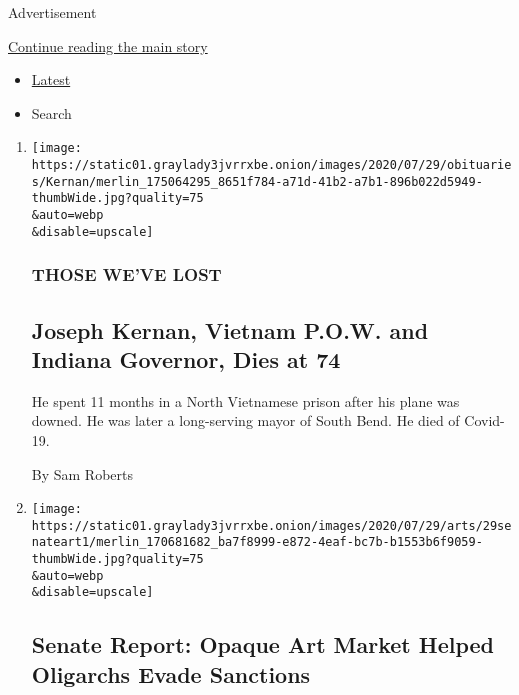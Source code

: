 Advertisement

\protect\hyperlink{after-mid1}{Continue reading the main story}

\begin{itemize}
\tightlist
\item
  \protect\hyperlink{stream-panel}{Latest}
\item
  Search
\end{itemize}

\begin{enumerate}
\def\labelenumi{\arabic{enumi}.}
\item
  \href{/2020/07/29/us/politics/joseph-kernan-dead-coronavirus.html}{}

  \texttt{[image: https://static01.graylady3jvrrxbe.onion/images/2020/07/29/obituaries/Kernan/merlin\_175064295\_8651f784-a71d-41b2-a7b1-896b022d5949-thumbWide.jpg?quality=75\\\&auto=webp\\\&disable=upscale]}

  \hypertarget{those-weve-lost}{%
  \subsubsection{THOSE WE'VE LOST}\label{those-weve-lost}}

  \hypertarget{joseph-kernan-vietnam-pow-and-indiana-governor-dies-at-74}{%
  \subsection{Joseph Kernan, Vietnam P.O.W. and Indiana Governor, Dies
  at
  74}\label{joseph-kernan-vietnam-pow-and-indiana-governor-dies-at-74}}

  He spent 11 months in a North Vietnamese prison after his plane was
  downed. He was later a long-serving mayor of South Bend. He died of
  Covid-19.

  By Sam Roberts
\item
  \href{/2020/07/29/arts/design/senate-report-art-market-russia-oligarchs-sanctions.html}{}

  \texttt{[image: https://static01.graylady3jvrrxbe.onion/images/2020/07/29/arts/29senateart1/merlin\_170681682\_ba7f8999-e872-4eaf-bc7b-b1553b6f9059-thumbWide.jpg?quality=75\\\&auto=webp\\\&disable=upscale]}

  \hypertarget{senate-report-opaque-art-market-helped-oligarchs-evade-sanctions}{%
  \subsection{Senate Report: Opaque Art Market Helped Oligarchs Evade
  Sanctions}\label{senate-report-opaque-art-market-helped-oligarchs-evade-sanctions}}


\end{enumerate}
